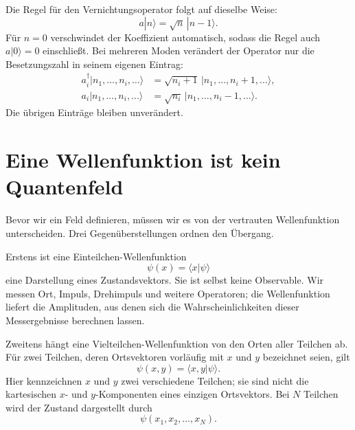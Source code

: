 \begin{classroomqa}
\end{classroomqa}

Die Regel für den Vernichtungsoperator folgt auf dieselbe Weise:
\begin{equation}
a|n\rangle=\sqrt n\,|n-1\rangle.
\label{eq:l06-lowering-rule}
\end{equation}
Für \(n=0\) verschwindet der Koeffizient automatisch, sodass die Regel auch \(a|0\rangle=0\) einschließt. Bei mehreren Moden verändert der Operator nur die Besetzungszahl in seinem eigenen Eintrag:
\begin{align}
a_i^\dagger|n_1,\ldots,n_i,\ldots\rangle
&=\sqrt{n_i+1}\,|n_1,\ldots,n_i+1,\ldots\rangle, \\
a_i|n_1,\ldots,n_i,\ldots\rangle
&=\sqrt{n_i}\,|n_1,\ldots,n_i-1,\ldots\rangle.
\label{eq:l06-multimode-ladders}
\end{align}
Die übrigen Einträge bleiben unverändert.

\section{Eine Wellenfunktion ist kein Quantenfeld}

Bevor wir ein Feld definieren, müssen wir es von der vertrauten Wellenfunktion unterscheiden. Drei Gegenüberstellungen ordnen den Übergang.

Erstens ist eine Einteilchen-Wellenfunktion
\begin{equation}
\psi(x)=\langle x|\psi\rangle
\end{equation}
eine Darstellung eines Zustandsvektors. Sie ist selbst keine Observable. Wir messen Ort, Impuls, Drehimpuls und weitere Operatoren; die Wellenfunktion liefert die Amplituden, aus denen sich die Wahrscheinlichkeiten dieser Messergebnisse berechnen lassen.

Zweitens hängt eine Vielteilchen-Wellenfunktion von den Orten aller Teilchen ab. Für zwei Teilchen, deren Ortsvektoren vorläufig mit \(x\) und \(y\) bezeichnet seien, gilt
\begin{equation}
\psi(x,y)=\langle x,y|\psi\rangle.
\end{equation}
Hier kennzeichnen \(x\) und \(y\) zwei verschiedene Teilchen; sie sind nicht die kartesischen \(x\)- und \(y\)-Komponenten eines einzigen Ortsvektors. Bei \(N\) Teilchen wird der Zustand dargestellt durch
\begin{equation}
\psi(x_1,x_2,\ldots,x_N).
\end{equation}


